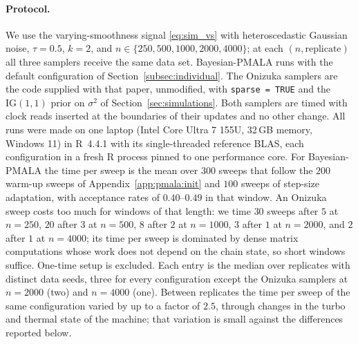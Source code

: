 \paragraph{Protocol.} We use the varying-smoothness signal \eqref{eq:sim_vs} with heteroscedastic Gaussian noise, $\tau = 0.5$, $k = 2$, and $n \in \{250, 500, 1000, 2000, 4000\}$; at each $(n, \text{replicate})$ all three samplers receive the same data set. Bayesian-PMALA runs with the default configuration of Section~\ref{subsec:individual}. The Onizuka samplers are the code supplied with that paper, unmodified, with \texttt{sparse = TRUE} and the $\mathrm{IG}(1,1)$ prior on $\sigma^2$ of Section~\ref{sec:simulations}. Both samplers are timed with clock reads inserted at the boundaries of their updates and no other change. All runs were made on one laptop (Intel Core Ultra 7 155U, 32\,GB memory, Windows 11) in R~4.4.1 with its single-threaded reference BLAS, each configuration in a fresh R process pinned to one performance core. For Bayesian-PMALA the time per sweep is the mean over $300$ sweeps that follow the $200$ warm-up sweeps of Appendix~\ref{app:pmala:init} and $100$ sweeps of step-size adaptation, with acceptance rates of $0.40$--$0.49$ in that window. An Onizuka sweep costs too much for windows of that length: we time $30$ sweeps after $5$ at $n = 250$, $20$ after $3$ at $n = 500$, $8$ after $2$ at $n = 1000$, $3$ after $1$ at $n = 2000$, and $2$ after $1$ at $n = 4000$; its time per sweep is dominated by dense matrix computations whose work does not depend on the chain state, so short windows suffice. One-time setup is excluded. Each entry is the median over replicates with distinct data seeds, three for every configuration except the Onizuka samplers at $n = 2000$ (two) and $n = 4000$ (one). Between replicates the time per sweep of the same configuration varied by up to a factor of $2.5$, through changes in the turbo and thermal state of the machine; that variation is small against the differences reported below.

